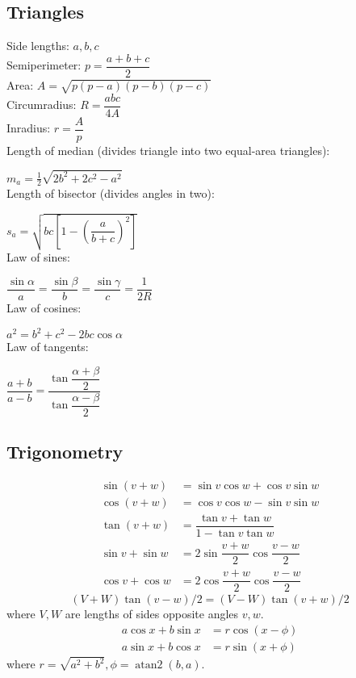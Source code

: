     \subsection{Triangles}
    Side lengths: $a,b,c$\\
    Semiperimeter: $p=\dfrac{a+b+c}{2}$\\
    Area: $A=\sqrt{p(p-a)(p-b)(p-c)}$\\
    Circumradius: $R=\dfrac{abc}{4A}$\\
    Inradius: $r=\dfrac{A}{p}$\\
    Length of median (divides triangle into two equal-area triangles): 
        
        $m_a=\tfrac{1}{2}\sqrt{2b^2+2c^2-a^2}$\\

    Length of bisector (divides angles in two): 
        
        $s_a=\sqrt{bc\left[1-\left(\dfrac{a}{b+c}\right)^2\right]}$\\

    Law of sines: 

        $\dfrac{\sin\alpha}{a}=\dfrac{\sin\beta}{b}=\dfrac{\sin\gamma}{c}=\dfrac{1}{2R}$\\

    Law of cosines: 
        
        $a^2=b^2+c^2-2bc\cos\alpha$\\
    
    Law of tangents: 
    
        $\dfrac{a+b}{a-b}=\dfrac{\tan\dfrac{\alpha+\beta}{2}}{\tan\dfrac{\alpha-\beta}{2}}$
    
    \subsection{Trigonometry}
    \begin{align*}
    \sin(v+w)&{}=\sin v\cos w+\cos v\sin w\\
    \cos(v+w)&{}=\cos v\cos w-\sin v\sin w\\
    \tan(v+w)&{}=\dfrac{\tan v+\tan w}{1-\tan v\tan w}\\
    \sin v+\sin w&{}=2\sin\dfrac{v+w}{2}\cos\dfrac{v-w}{2}\\
    \cos v+\cos w&{}=2\cos\dfrac{v+w}{2}\cos\dfrac{v-w}{2}
    \end{align*}
    \[ (V+W)\tan(v-w)/2{}=(V-W)\tan(v+w)/2 \]
    where $V, W$ are lengths of sides opposite angles $v, w$.
    \begin{align*}
        a\cos x+b\sin x&=r\cos(x-\phi)\\
        a\sin x+b\cos x&=r\sin(x+\phi)
    \end{align*}
    where $r=\sqrt{a^2+b^2}, \phi=\operatorname{atan2}(b,a)$.
    
